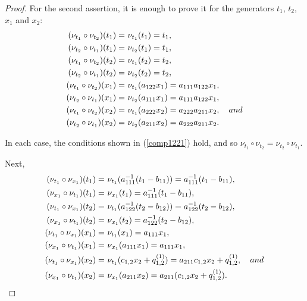 \documentclass{amsart}
\theoremstyle{definition}
\theoremstyle{remark}
\numberwithin{equation}{section}
\begin{document}
\begin{proof}
For the second assertion, it is enough to prove it for the generators $t_1$, $t_2$, $x_1$ and $x_2$:
\begin{align}
    (\nu_{t_1} \circ \nu_{t_2})(t_1) = &\ \nu_{t_1}(t_1)=t_1, \notag \\
    (\nu_{t_2} \circ \nu_{t_1})(t_1) = &\ \nu_{t_2}(t_1) = t_1, \notag \\
    (\nu_{t_1} \circ \nu_{t_2})(t_2) = &\ \nu_{t_1}(t_2)=t_2, \notag \\
    (\nu_{t_2} \circ \nu_{t_1})(t_2) = &\ \nu_{t_2}(t_2) = t_2, \notag \\
    (\nu_{t_1} \circ \nu_{t_2})(x_1) = &\ \nu_{t_1}(a_{122}x_1)=a_{111}a_{122}x_1, \label{comp1221}\\ 
    (\nu_{t_2} \circ \nu_{t_1})(x_1) = &\  \nu_{t_2}(a_{111}x_1)=a_{111}a_{122}x_1, \notag \\
    (\nu_{t_1} \circ \nu_{t_2})(x_2) = &\ \nu_{t_1}(a_{222}x_2)=a_{222}a_{211}x_2, \quad {\rm and} \notag \\  
 (\nu_{t_2} \circ \nu_{t_1})(x_2) = &\ \nu_{t_2}(a_{211}x_2)=a_{222}a_{211}x_2. \notag
\end{align}

In each case, the conditions shown in {\rm (}\ref{comp1221}{\rm )} hold, and so $\nu_{t_1} \circ \nu_{t_2}=\nu_{t_2} \circ \nu_{t_1}$.

Next, 
\begin{align}
    (\nu_{t_1} \circ \nu_{x_1})(t_1) = &\ \nu_{t_1}(a_{111}^{-1}(t_1-b_{11}))=a_{111}^{-1}(t_1-b_{11}), \notag \\
    (\nu_{x_1} \circ \nu_{t_1})(t_1) = &\ \nu_{x_1}(t_1) = a_{111}^{-1}(t_1-b_{11}), \notag \\
    (\nu_{t_1} \circ \nu_{x_1})(t_2) = &\ \nu_{t_1}(a_{122}^{-1}(t_2-b_{12}))=a_{122}^{-1}(t_2-b_{12}), \notag \\
    (\nu_{x_1} \circ \nu_{t_1})(t_2) = &\ \nu_{x_1}(t_2) = a_{122}^{-1}(t_2-b_{12}), \notag \\
    (\nu_{t_1} \circ \nu_{x_1})(x_1) = &\ \nu_{t_1}(x_1)=a_{111}x_1, \label{comp1111}\\ 
    (\nu_{x_1} \circ \nu_{t_1})(x_1) = &\  \nu_{x_1}(a_{111}x_1)=a_{111}x_1, \notag \\
    (\nu_{t_1} \circ \nu_{x_1})(x_2) = &\ \nu_{t_1}(c_{1,2}x_2+q_{1,2}^{(1)})=a_{211}c_{1,2}x_2+q_{1,2}^{(1)}, \quad {\rm and} \notag \\  
 (\nu_{x_1} \circ \nu_{t_1})(x_2) = &\ \nu_{x_1}(a_{211}x_2)=a_{211}(c_{1,2}x_2+q_{1,2}^{(1)}). \notag
\end{align}


\end{proof}
\end{document}
